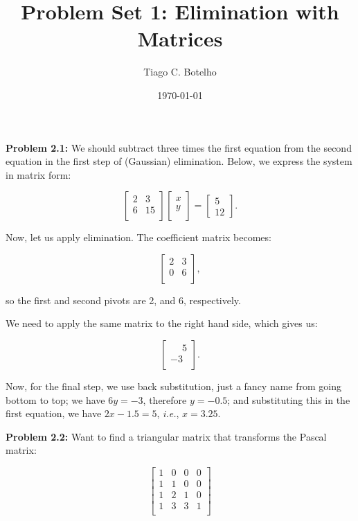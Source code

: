 \documentclass{article}
\title{Problem Set 1: Elimination with Matrices}
\author{Tiago C. Botelho}
\date{\today}
\begin{document}
\maketitle

\noindent \textbf{Problem 2.1:} We should subtract three times the first equation from the second equation in the first step of (Gaussian) elimination. Below, we express the system in matrix form:

\[
\begin{bmatrix}
2 & 3\\
6 & 15\\
\end{bmatrix}
\begin{bmatrix}
x\\
y\\
\end{bmatrix}
=
\begin{bmatrix}
5\\
12
\end{bmatrix}.
\]

Now, let us apply elimination. The coefficient matrix becomes:

\[
\begin{bmatrix}
2 & 3\\
0 & 6\\
\end{bmatrix},
\]

so the first and second pivots are 2, and 6, respectively.

We need to apply the same matrix to the right hand side, which gives us:

\[
\begin{bmatrix}
\phantom{-}5\\
-3\\
\end{bmatrix}.
\]

Now, for the final step, we use back substitution, just a fancy name from going bottom to top; we have $6y = -3$, therefore $y = -0.5$; and substituting this in the first equation, we have $2x -1.5 = 5$, \textit{i.e.}, $x = 3.25$.

\noindent \textbf{Problem 2.2:} Want to find a triangular matrix that transforms the Pascal matrix:

\[
\begin{bmatrix}
1 & 0 & 0 & 0\\
1 & 1 & 0 & 0\\
1 & 2 & 1 & 0\\
1 & 3 & 3 & 1\\
\end{bmatrix}
\]
\end{document}
